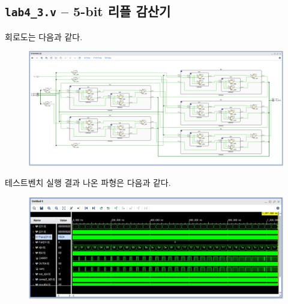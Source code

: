 \documentclass{scrartcl}
\begin{document}
\subsection{\texttt{lab4\_3.v} -- 5-bit 리플 감산기}
회로도는 다음과 같다.
\begin{figure}[H]
  \centering
  \includegraphics[width=0.9\linewidth]{lab4_3_schematic.png}
\end{figure}
테스트벤치 실행 결과 나온 파형은 다음과 같다.
\begin{figure}[H]
  \centering
  \includegraphics[width=0.9\linewidth]{lab4_3_waveform.png}
\end{figure}
\end{document}
